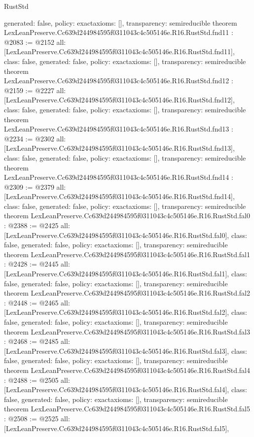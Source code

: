 \begin{lexlean}{RustStd}
\begin{coremodule}
{  generated: false,
  policy: exact{axioms: []},
  transparency: semireducible
}
theorem LexLeanPreserve.Cc639d244984595f0311043c4c505146e.R16.RustStd.fnd11 : @2083 := @2152 {
  all: [LexLeanPreserve.Cc639d244984595f0311043c4c505146e.R16.RustStd.fnd11],
  class: false,
  generated: false,
  policy: exact{axioms: []},
  transparency: semireducible
}
theorem LexLeanPreserve.Cc639d244984595f0311043c4c505146e.R16.RustStd.fnd12 : @2159 := @2227 {
  all: [LexLeanPreserve.Cc639d244984595f0311043c4c505146e.R16.RustStd.fnd12],
  class: false,
  generated: false,
  policy: exact{axioms: []},
  transparency: semireducible
}
theorem LexLeanPreserve.Cc639d244984595f0311043c4c505146e.R16.RustStd.fnd13 : @2234 := @2302 {
  all: [LexLeanPreserve.Cc639d244984595f0311043c4c505146e.R16.RustStd.fnd13],
  class: false,
  generated: false,
  policy: exact{axioms: []},
  transparency: semireducible
}
theorem LexLeanPreserve.Cc639d244984595f0311043c4c505146e.R16.RustStd.fnd14 : @2309 := @2379 {
  all: [LexLeanPreserve.Cc639d244984595f0311043c4c505146e.R16.RustStd.fnd14],
  class: false,
  generated: false,
  policy: exact{axioms: []},
  transparency: semireducible
}
theorem LexLeanPreserve.Cc639d244984595f0311043c4c505146e.R16.RustStd.fal0 : @2388 := @2425 {
  all: [LexLeanPreserve.Cc639d244984595f0311043c4c505146e.R16.RustStd.fal0],
  class: false,
  generated: false,
  policy: exact{axioms: []},
  transparency: semireducible
}
theorem LexLeanPreserve.Cc639d244984595f0311043c4c505146e.R16.RustStd.fal1 : @2428 := @2445 {
  all: [LexLeanPreserve.Cc639d244984595f0311043c4c505146e.R16.RustStd.fal1],
  class: false,
  generated: false,
  policy: exact{axioms: []},
  transparency: semireducible
}
theorem LexLeanPreserve.Cc639d244984595f0311043c4c505146e.R16.RustStd.fal2 : @2448 := @2465 {
  all: [LexLeanPreserve.Cc639d244984595f0311043c4c505146e.R16.RustStd.fal2],
  class: false,
  generated: false,
  policy: exact{axioms: []},
  transparency: semireducible
}
theorem LexLeanPreserve.Cc639d244984595f0311043c4c505146e.R16.RustStd.fal3 : @2468 := @2485 {
  all: [LexLeanPreserve.Cc639d244984595f0311043c4c505146e.R16.RustStd.fal3],
  class: false,
  generated: false,
  policy: exact{axioms: []},
  transparency: semireducible
}
theorem LexLeanPreserve.Cc639d244984595f0311043c4c505146e.R16.RustStd.fal4 : @2488 := @2505 {
  all: [LexLeanPreserve.Cc639d244984595f0311043c4c505146e.R16.RustStd.fal4],
  class: false,
  generated: false,
  policy: exact{axioms: []},
  transparency: semireducible
}
theorem LexLeanPreserve.Cc639d244984595f0311043c4c505146e.R16.RustStd.fal5 : @2508 := @2525 {
  all: [LexLeanPreserve.Cc639d244984595f0311043c4c505146e.R16.RustStd.fal5],
}
\end{coremodule}
\end{lexlean}

